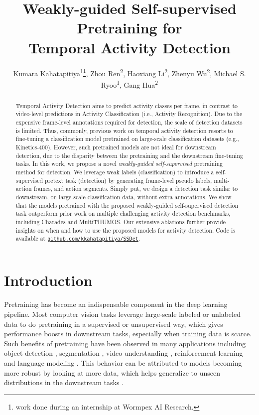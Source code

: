 \documentclass[letterpaper]{article} \usepackage{aaai23}  \usepackage{times}  \usepackage{helvet}  \usepackage{courier}  \usepackage[hyphens]{url}  \usepackage{graphicx} \urlstyle{rm} \def\UrlFont{\rm}  \usepackage{natbib}  \usepackage{caption} \frenchspacing  \setlength{\pdfpagewidth}{8.5in}  \setlength{\pdfpageheight}{11in}  \usepackage{algorithm}
\title{Weakly-guided Self-supervised Pretraining for\\Temporal Activity Detection}
\author{Kumara Kahatapitiya\textsuperscript{\rm 1}\thanks{work done during an internship at Wormpex AI Research.}, Zhou Ren\textsuperscript{\rm 2}, Haoxiang Li\textsuperscript{\rm 2}, Zhenyu Wu\textsuperscript{\rm 2}, Michael S. Ryoo\textsuperscript{\rm 1}, Gang Hua\textsuperscript{\rm 2}
}
\newcommand{\ch}{}
\begin{document}
\maketitle

\begin{abstract}

Temporal Activity Detection aims to predict activity classes per frame, in contrast to video-level predictions in Activity Classification (i.e., Activity Recognition). Due to the expensive frame-level annotations required for detection, the scale of detection datasets is limited. Thus, commonly, previous work on temporal activity detection resorts to fine-tuning a classification model pretrained on large-scale classification datasets (e.g., Kinetics-400). However, such pretrained models are not ideal for downstream detection, due to the disparity between the pretraining and the downstream fine-tuning tasks. \ch{In this work, we propose a novel \textit{weakly-guided self-supervised} pretraining method for detection. We leverage weak labels (classification) to introduce a self-supervised pretext task (detection) by generating frame-level pseudo labels, multi-action frames, and action segments. Simply put, we design a detection task similar to downstream, on large-scale classification data, without extra annotations.} We show that the models pretrained with the proposed weakly-guided self-supervised detection task outperform prior work on multiple challenging activity detection benchmarks, including Charades and MultiTHUMOS. Our extensive ablations further provide insights on when and how to use the proposed models for activity detection. Code is available at \href{https://github.com/kkahatapitiya/SSDet}{\texttt{github.com/kkahatapitiya/SSDet}}.

\end{abstract}


\section{Introduction}

Pretraining has become an indispensable component in the deep learning pipeline. Most computer vision tasks leverage large-scale labeled or unlabeled data to do pretraining in a supervised or unsupervised way, which gives performance boosts in downstream tasks, especially when training data is scarce. Such benefits of pretraining have been observed in many applications including object detection \cite{mahajan2018exploring, dai2021up}, segmentation \cite{poudel2019fast}, video understanding \cite{ghadiyaram2019large}, reinforcement learning \cite{schwarzer2021pretraining} and language modeling \cite{liu2019roberta}. This behavior can be attributed to models becoming more robust by looking at more data, which helps generalize to unseen distributions in the downstream tasks \cite{bommasani2021opportunities}. 
\end{document}
